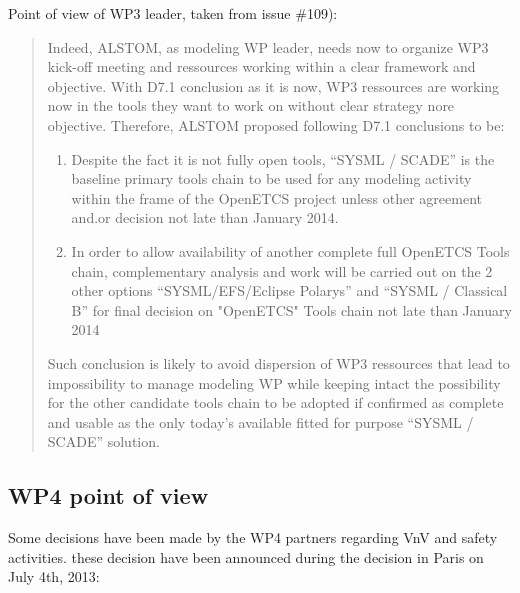 Point of view of WP3 leader, taken from issue \#109):

\begin{quote}
Indeed, ALSTOM, as modeling WP leader, needs now to organize WP3 kick-off meeting and ressources working within a clear framework and objective. With D7.1 conclusion as it is now, WP3 ressources are working now in the tools they want to work on without clear strategy nore objective.
Therefore, ALSTOM proposed following D7.1 conclusions to be:

\begin{enumerate}
\item Despite the fact it is not fully open tools, ``SYSML / SCADE'' is the baseline primary tools chain to be used for any modeling activity within the frame of the OpenETCS project unless other agreement and.or decision not late than January 2014.

\item In order to allow availability of another complete full OpenETCS Tools chain, complementary analysis and work will be carried out on the 2 other options ``SYSML/EFS/Eclipse Polarys'' and ``SYSML / Classical B'' for final decision on "OpenETCS" Tools chain not late than January 2014
\end{enumerate}

Such conclusion is likely to avoid dispersion of WP3 ressources that lead to impossibility to manage modeling WP while keeping intact the possibility for the other candidate tools chain to be adopted if confirmed as complete and usable as the only today's available fitted for purpose ``SYSML / SCADE'' solution.
\end{quote}

\subsection{WP4 point of view}

Some decisions have been made by the WP4 partners regarding VnV and safety activities. these decision have been announced during the decision in Paris on July 4th, 2013:




